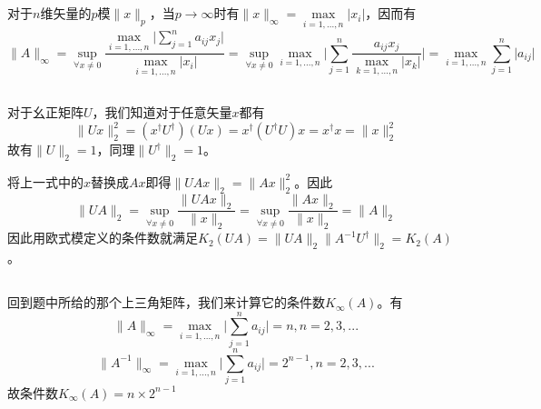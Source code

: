 \documentclass[UTF8]{ctexart}
\begin{document}
\subsection{}
对于$n$维矢量的$p$模$\lVert x \rVert_p$，当$p\rightarrow \infty$时有$\lVert x \rVert_{\infty}=\max\limits_{i=1,...,n} \lvert x_i \rvert$，因而有
\begin{equation}
\lVert A \rVert_{\infty}=\sup\limits_{\forall x\neq0} \frac
{\max\limits_{i=1,...,n} \lvert \sum\limits_{j=1}^n a_{ij}x_j \rvert}
{\max\limits_{i=1,...,n} \lvert x_i \rvert}
=\sup\limits_{\forall x\neq0} 
\max\limits_{i=1,...,n} \lvert \sum\limits_{j=1}^n \frac
{a_{ij}x_j }
{\max\limits_{k=1,...,n} \lvert x_k \rvert} \rvert
=\max\limits_{i=1,...,n} \sum\limits_{j=1}^n \lvert a_{ij}\rvert
\end{equation}

\subsection{}
对于幺正矩阵$U$，我们知道对于任意矢量$x$都有
\begin{equation}
\lVert Ux \rVert_2^2 = (x^{\dag}U^{\dag})(Ux)=x^{\dag}(U^{\dag}U)x=x^{\dag}x=\lVert x \rVert_2^2
\end{equation}
故有$\lVert U \rVert_2=1$，同理$\lVert U^{\dag} \rVert_2=1$。

将上一式中的$x$替换成$Ax$即得$\lVert UAx \rVert_2=\lVert Ax \rVert_2^2$。因此
\begin{equation}
\lVert UA\rVert_2=\sup\limits_{\forall x\neq0}\frac{\lVert UAx\rVert_2}{\lVert x\rVert_2}=\sup\limits_{\forall x\neq0}\frac{\lVert Ax\rVert_2}{\lVert x\rVert_2}=\lVert A\rVert_2
\end{equation}
因此用欧式模定义的条件数就满足$K_2(UA)=\lVert UA\rVert_2\lVert A^{-1}U^{\dag}\rVert_2=K_2(A)$。

\subsection{}
回到题中所给的那个上三角矩阵，我们来计算它的条件数$K_{\infty}(A)$。有
\begin{equation}
\lVert A \rVert_{\infty}=\max\limits_{i=1,...,n} \lvert \sum\limits_{j=1}^n a_{ij}\rvert=n,n=2,3,...
\end{equation}
\begin{equation}
\lVert A^{-1} \rVert_{\infty}=\max\limits_{i=1,...,n} \lvert \sum\limits_{j=1}^n a_{ij}\rvert=2^{n-1},n=2,3,...
\end{equation}
故条件数$K_{\infty}(A)=n\times 2^{n-1}$
\end{document}

